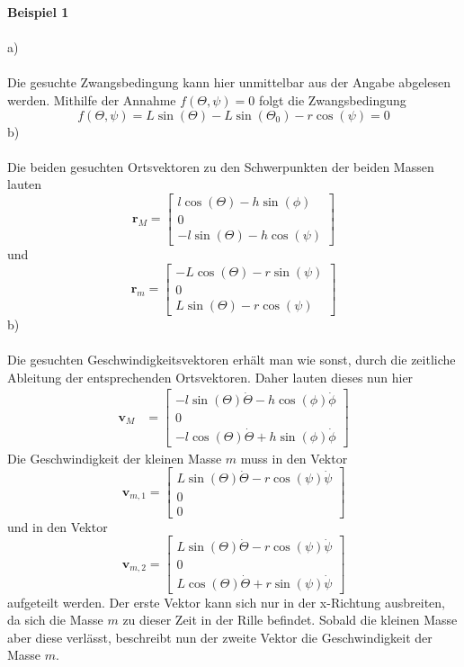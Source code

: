 \textbf{Beispiel 1}\\ \\
a)\\ \\
Die gesuchte Zwangsbedingung kann hier unmittelbar aus der Angabe abgelesen werden. Mithilfe der Annahme $f(\varTheta, \psi) = 0$ folgt die Zwangsbedingung
\[
	f(\varTheta, \psi) = L \sin(\varTheta) - L \sin(\varTheta_0) - r\cos(\psi)=0
\]
b)\\ \\
Die beiden gesuchten Ortsvektoren zu den Schwerpunkten der beiden Massen lauten
\[
	\textbf{r}_M = \begin{bmatrix}
		l\cos(\varTheta) - h\sin(\phi) \\
		0 \\
		-l\sin(\varTheta) - h\cos(\psi)
	\end{bmatrix}
\]
und
\[
	\textbf{r}_m = \begin{bmatrix}
		-L\cos(\varTheta) - r\sin(\psi) \\
		0 \\
		L\sin(\varTheta) - r\cos(\psi)
	\end{bmatrix}
\]
b)\\ \\
Die gesuchten Geschwindigkeitsvektoren erhält man wie sonst, durch die zeitliche Ableitung der entsprechenden Ortsvektoren. Daher lauten dieses nun hier
\begin{align*}
	\textbf{v}_M &= \begin{bmatrix}
		-l\sin(\varTheta)\dot{\varTheta} - h\cos(\phi)\dot{\phi} \\
		0 \\
		-l\cos(\varTheta)\dot{\varTheta} + h\sin(\phi)\dot{\phi}
	\end{bmatrix}
\end{align*}
Die Geschwindigkeit der kleinen Masse $m$ muss in den Vektor
\[
	\textbf{v}_{m,1} = \begin{bmatrix}
		L\sin(\varTheta)\dot{\varTheta} - r\cos(\psi)\dot{\psi} \\
		0 \\
		0
	\end{bmatrix}
\]
und in den Vektor
\[
	\textbf{v}_{m,2} = \begin{bmatrix}
		L\sin(\varTheta)\dot{\varTheta} - r\cos(\psi)\dot{\psi} \\
		0 \\
		L\cos(\varTheta)\dot{\varTheta} + r\sin(\psi)\dot{\psi}
	\end{bmatrix}
\]
aufgeteilt werden. Der erste Vektor kann sich nur in der x-Richtung ausbreiten, da sich die Masse $m$ zu dieser Zeit in der Rille befindet. Sobald die kleinen Masse aber diese verlässt, beschreibt nun der zweite Vektor die Geschwindigkeit der Masse $m$.
